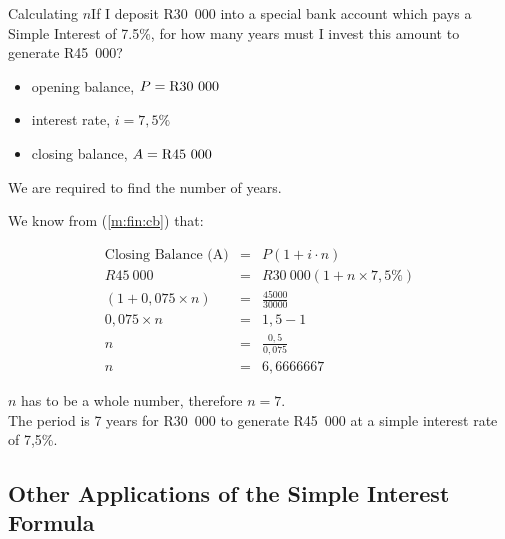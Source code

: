 \documentclass[10pt,a4paper,titlepage,twoside,openright]{report}
\begin{document}
\begin{wex}
{Calculating $n$}{If I deposit R30~000 into a special bank account which pays a Simple Interest of 7.5\%, for how many years must I invest this amount to generate R45~000?}{
\begin{itemize}[topsep=0ex, partopsep=\parskip,itemsep=\parskip]
\item{opening balance, $P=\rm{R}30~000$}
\item{interest rate, $i=7,5\%$}
\item{closing balance, $A=\rm{R}45~000$}
\end{itemize}
We are required to find the number of years.

We know from (\ref{m:fin:cb}) that:

\begin{eqnarray*}
\mbox{Closing Balance (A)} &=& P (1 + i\cdot n)\\
R45~000&=& R30~000 (1 + n\times 7,5\%)\\
(1+ 0,075\times{n})&=&\frac{45000}{30000}\\
0,075\times{n}&=&1,5 - 1\\
n&=&\frac{0,5}{0,075}\\
n&=&6,6666667
\end{eqnarray*}

$n$ has to be a whole number, therefore $n = 7$.\\
The period is 7 years for R30~000 to generate R45~000 at a simple interest rate of 7,5\%.}
\end{wex}

\subsection{Other Applications of the Simple Interest Formula}
\end{document}
